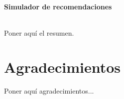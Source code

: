 \chapter*{}

\cleardoublepage
\thispagestyle{empty}

\begin{center}
{\large\bfseries Simulador de recomendaciones}\\
\end{center}


\vspace{0.7cm}
\\

Poner aquí el resumen.
\cleardoublepage


\thispagestyle{empty}


\chapter*{Agradecimientos}
\thispagestyle{empty}

       \vspace{1cm}


Poner aquí agradecimientos...

